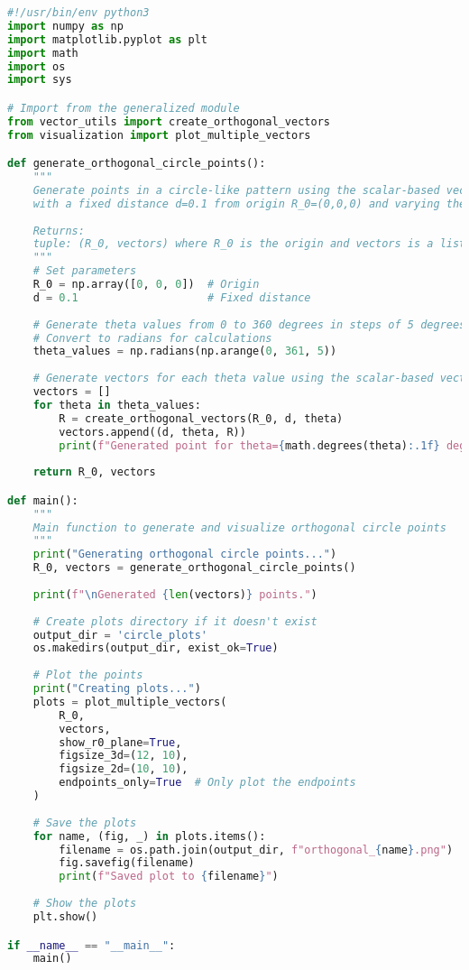 \begin{lstlisting}[language=Python]
#!/usr/bin/env python3
import numpy as np
import matplotlib.pyplot as plt
import math
import os
import sys

# Import from the generalized module
from vector_utils import create_orthogonal_vectors
from visualization import plot_multiple_vectors

def generate_orthogonal_circle_points():
    """
    Generate points in a circle-like pattern using the scalar-based vector formula
    with a fixed distance d=0.1 from origin R_0=(0,0,0) and varying theta
    
    Returns:
    tuple: (R_0, vectors) where R_0 is the origin and vectors is a list of (d, theta, R) tuples
    """
    # Set parameters
    R_0 = np.array([0, 0, 0])  # Origin
    d = 0.1                    # Fixed distance
    
    # Generate theta values from 0 to 360 degrees in steps of 5 degrees
    # Convert to radians for calculations
    theta_values = np.radians(np.arange(0, 361, 5))
    
    # Generate vectors for each theta value using the scalar-based vector formula
    vectors = []
    for theta in theta_values:
        R = create_orthogonal_vectors(R_0, d, theta)
        vectors.append((d, theta, R))
        print(f"Generated point for theta={math.degrees(theta):.1f} deg: {R}")
    
    return R_0, vectors

def main():
    """
    Main function to generate and visualize orthogonal circle points
    """
    print("Generating orthogonal circle points...")
    R_0, vectors = generate_orthogonal_circle_points()
    
    print(f"\nGenerated {len(vectors)} points.")
    
    # Create plots directory if it doesn't exist
    output_dir = 'circle_plots'
    os.makedirs(output_dir, exist_ok=True)
    
    # Plot the points
    print("Creating plots...")
    plots = plot_multiple_vectors(
        R_0, 
        vectors,
        show_r0_plane=True,
        figsize_3d=(12, 10),
        figsize_2d=(10, 10),
        endpoints_only=True  # Only plot the endpoints
    )
    
    # Save the plots
    for name, (fig, _) in plots.items():
        filename = os.path.join(output_dir, f"orthogonal_{name}.png")
        fig.savefig(filename)
        print(f"Saved plot to {filename}")
    
    # Show the plots
    plt.show()

if __name__ == "__main__":
    main()
\end{lstlisting}

